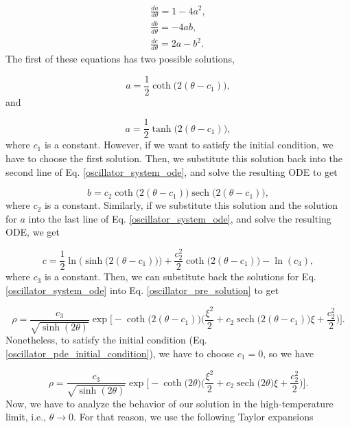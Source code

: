 \documentclass{article}
\DeclareMathOperator{\sech}{sech}
\begin{document}
\begin{equation}\label{oscillator_system_ode}
    \begin{split}
        \frac{d a}{d\theta} = 1 - 4a^{2}, \\ \frac{d b}{d\theta}=-4ab, \\ \frac{dc}{d\theta}=2a-b^{2}.
    \end{split}
\end{equation}
%
The first of these equations has two possible solutions,

\begin{equation}
    a = \frac{1}{2} \coth\big(2(\theta - c_{1})\big),
\end{equation}
%
and 

\begin{equation}
    a = \frac{1}{2} \tanh\big(2(\theta - c_{1})\big),
\end{equation}
%
where $c_{1}$ is a constant.
However, if we want to satisfy the initial condition, we have to choose the first solution. Then, we substitute this solution back into the second line of Eq. \ref{oscillator_system_ode}, and solve the resulting ODE to get

\begin{equation}
    b = c_{2} \coth \big( 2(\theta - c_{1}) \big) \sech \big( 2(\theta - c_{1}) \big),
\end{equation}
%
where $c_{2}$ is a constant. Similarly, if we substitute this solution and the solution for $a$ into the last line of Eq. \ref{oscillator_system_ode}, and solve the resulting ODE, we get

\begin{equation}
    c = \frac{1}{2} \ln \Big(\sinh \big( 2(\theta - c_{1}) \big) \Big) + \frac{c_{2}^{2}}{2} \coth \big( 2(\theta - c_{1}) \big) - \ln (c_{3}),
\end{equation}
%
where $c_{3}$ is a constant. Then, we can substitute back the solutions for Eq. \ref{oscillator_system_ode} into Eq. \ref{oscillator_pre_solution} to get

\begin{equation}
    \rho = \frac{c_{3}}{\sqrt{\sinh(2\theta)}} \exp \bigg[ -\coth \big(2(\theta - c_{1})) \bigg( \frac{\xi^{2}}{2} + c_{2} \sech \big( 2(\theta - c_{1}) \big)\xi + \frac{c_{2}^{2}}{2} \bigg) \bigg]. 
\end{equation}
%
Nonetheless, to satisfy the initial condition (Eq. \ref{oscillator_pde_initial_condition}), we have to choose $c_{1}=0$, so we have

\begin{equation}
    \rho = \frac{c_{3}}{\sqrt{\sinh(2\theta)}} \exp \bigg[ -\coth \big(2\theta) \bigg( \frac{\xi^{2}}{2} + c_{2} \sech \big( 2\theta \big)\xi + \frac{c_{2}^{2}}{2} \bigg) \bigg]. 
\end{equation}
%
Now, we have to analyze the behavior of our solution in the high-temperature limit, i.e., $\theta \longrightarrow 0$. For that reason, we use the following Taylor expansions
\end{document}
